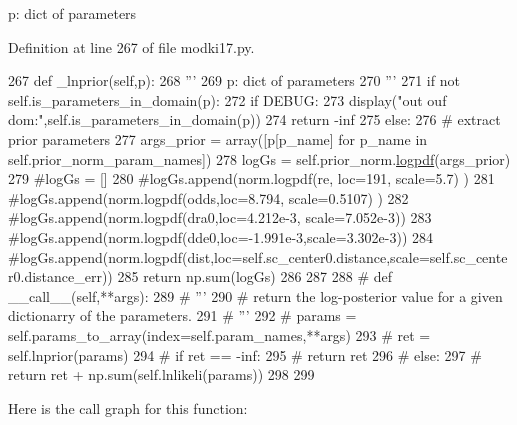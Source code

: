 \begin{DoxyVerb}p: dict of parameters
\end{DoxyVerb}
 

Definition at line 267 of file modki17.\+py.


\begin{DoxyCode}
267     \textcolor{keyword}{def }\_lnprior(self,p):
268         \textcolor{stringliteral}{'''}
269 \textcolor{stringliteral}{        p: dict of parameters}
270 \textcolor{stringliteral}{        '''}
271         \textcolor{keywordflow}{if} \textcolor{keywordflow}{not} self.is\_parameters\_in\_domain(p):
272             \textcolor{keywordflow}{if} DEBUG:
273                 display(\textcolor{stringliteral}{"out ouf dom:"},self.is\_parameters\_in\_domain(p))
274             \textcolor{keywordflow}{return} -inf
275         \textcolor{keywordflow}{else}:
276             \textcolor{comment}{# extract prior parameters}
277             args\_prior = array([p[p\_name] \textcolor{keywordflow}{for} p\_name \textcolor{keywordflow}{in} self.prior\_norm\_param\_names]) 
278             logGs = self.prior\_norm.\hyperlink{namespacemcgenerator_a23bb8cafe013a76952e0a2e881d28c5a}{logpdf}(args\_prior)
279             \textcolor{comment}{#logGs = []}
280             \textcolor{comment}{#logGs.append(norm.logpdf(re,  loc=191,      scale=5.7)     )}
281             \textcolor{comment}{#logGs.append(norm.logpdf(odds,loc=8.794,    scale=0.5107)  )}
282             \textcolor{comment}{#logGs.append(norm.logpdf(dra0,loc=4.212e-3, scale=7.052e-3))}
283             \textcolor{comment}{#logGs.append(norm.logpdf(dde0,loc=-1.991e-3,scale=3.302e-3))}
284             \textcolor{comment}{
      #logGs.append(norm.logpdf(dist,loc=self.sc\_center0.distance,scale=self.sc\_center0.distance\_err))}
285             \textcolor{keywordflow}{return} np.sum(logGs)
286 
287         
288 \textcolor{comment}{#    def \_\_call\_\_(self,**args):}
289 \textcolor{comment}{#        '''}
290 \textcolor{comment}{#        return the log-posterior value for a given dictionarry of the parameters.}
291 \textcolor{comment}{#        '''}
292 \textcolor{comment}{#        params = self.params\_to\_array(index=self.param\_names,**args)}
293 \textcolor{comment}{#        ret = self.lnprior(params)}
294 \textcolor{comment}{#        if ret == -inf:}
295 \textcolor{comment}{#            return ret}
296 \textcolor{comment}{#        else:}
297 \textcolor{comment}{#            return ret + np.sum(self.lnlikeli(params)) }
298     
299     
\end{DoxyCode}
Here is the call graph for this function\+:\nopagebreak
